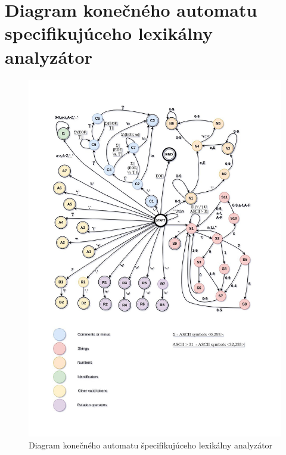 \documentclass[a4paper, 11pt]{article}
\begin{document}
    \section*{Diagram konečného automatu specifikujúceho lexikálny analyzátor}
    \label{sec: automat}
    \begin{figure}[!ht]
        \centering
        \vspace{-1.2cm}
        \includegraphics[width=0.95\linewidth]{src/FSM_PDF.pdf}
        \caption{Diagram konečného automatu špecifikujúceho lexikálny analyzátor}
        \label{figure:fa_graph}
    \end{figure}

\end{document}
